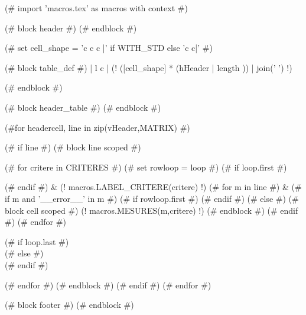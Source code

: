 (# import 'macros.tex' as macros with context #)

(# block header #)
(# endblock #)


\setlength\tabcolsep{0.07cm}

(# set cell_shape = 'c c c |' if WITH_STD else 'c c|' #)
\begin{table}
    \centering
    \begin{tabular}
        (# block table_def #){ | l c | (! ([cell_shape] *  (hHeader | length )) | join(' ') !) }
    (# endblock #)



    (# block header_table #)
    (# endblock #)



    (#for headercell, line in zip(vHeader,MATRIX) #)

    (# if line #)
    \hline
    (# block line scoped #)

    (# for critere in CRITERES #)
    (# set rowloop = loop #)
    (# if loop.first #)


    (# endif #)
    & (! macros.LABEL_CRITERE(critere) !)
    (# for m in line #)
    &
    (# if m and '__error__' in m #)
        (# if rowloop.first #)  (# endif #)
    (# else #)
    (# block cell scoped #)
    (! macros.MESURES(m,critere) !)
    (# endblock #)
    (# endif #)
    (# endfor #)

    (# if loop.last #) \\ (# else #) \\* (# endif #)

    (# endfor #)
    (# endblock #)
    (# endif #)
    (# endfor #)
    \hline

    \end{tabular}

    \caption{\textbf{(! title !)}. (! description !)}
    \label{tab:(! label !)}

\end{table}

(# block footer #)
(# endblock #)
